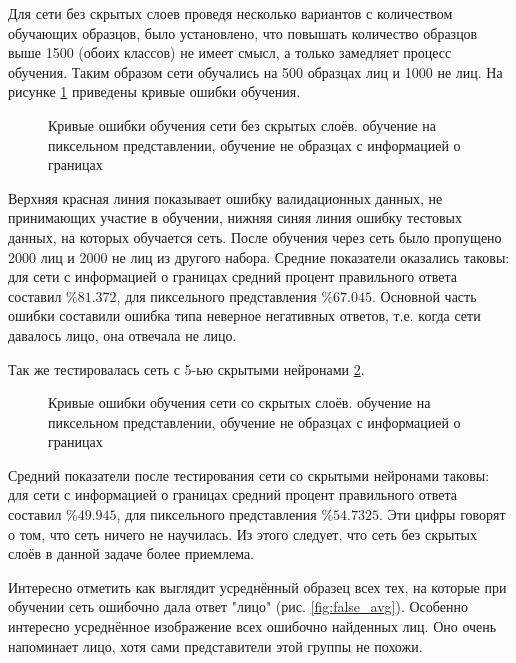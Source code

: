 \documentclass[12pt]{report}
\begin{document}
Для сети без скрытых слоев проведя несколько вариантов с количеством обучающих образцов, было установлено, что 
повышать количество образцов выше 1500 (обоих классов) не имеет смысл, а только замедляет процесс обучения. Таким 
образом сети обучались на 500 образцах лиц и 1000 не лиц. На рисунке \ref{fig:ann_flat_chart} приведены кривые 
ошибки 
обучения.

\begin{figure}[h]
	\centering
	\caption{Кривые ошибки обучения сети без скрытых слоёв.  обучение на пиксельном 
представлении, 
 обучение не образцах с информацией о границах}
	\label{fig:ann_flat_chart}
\end{figure}

Верхняя красная линия показывает ошибку валидационных данных, не принимающих участие в обучении, нижняя синяя линия 
ошибку тестовых данных, на которых обучается сеть. После обучения через сеть было пропущено 2000 лиц и 2000 не лиц 
из 
другого набора. Средние показатели оказались таковы: для сети с информацией о границах средний процент правильного 
ответа составил $\%81.372$, для пиксельного представления $\%67.045$. Основной часть ошибки составили ошибка типа 
неверное негативных ответов, т.е. когда сети давалось лицо, она отвечала не лицо.

Так же тестировалась сеть с 5-ью скрытыми нейронами \ref{fig:ann_hidd_chart}.
\begin{figure}[h]
	\centering
	\caption{Кривые ошибки обучения сети со скрытых слоёв.  обучение на пиксельном 
представлении, 
 обучение не образцах с информацией о границах}
	\label{fig:ann_hidd_chart}
\end{figure}

Средний показатели после тестирования сети со скрытыми нейронами таковы: для сети с информацией о границах средний 
процент правильного ответа составил $\%49.945$, для пиксельного представления $\%54.7325$. Эти цифры говорят о том, 
что сеть ничего не научилась. Из этого следует, что сеть без скрытых слоёв в данной задаче более приемлема.

Интересно отметить как выглядит усреднённый образец всех тех, на которые при обучении сеть ошибочно дала ответ 
"лицо" (рис. \ref{fig:false_avg}). Особенно интересно усреднённое изображение всех ошибочно найденных лиц. Оно 
очень 
напоминает лицо, хотя сами представители этой группы не похожи. 
\end{document}
